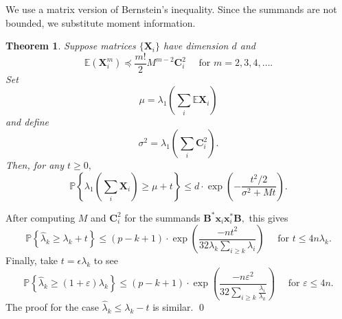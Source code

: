 \documentclass[xcolor={svgnames,pdftex,dvipsnames,table},10pt]{beamer} %
\newcommand{\mat}[1]{\ensuremath{\mathbf{#1}}}
\newcommand{\Prob}[1]{\ensuremath{\mathbb{P}\left\{#1 \right\}}}
\renewcommand{\star}{*}
\newcommand{\E}{\ensuremath{\mathbb{E}}}
\newtheorem*{thm}{Theorem}
\begin{document}
\begin{frame}{}
 We use a matrix version of Bernstein's inequality. Since the summands are not bounded, we substitute moment information.

\begin{thm}
Suppose matrices $\{\mat{X}_i\}$ have dimension $d$ and 
\[\textstyle \E(\mat{X}_i^m) \preceq \frac{m!}{2} M^{m-2} \mat{C}_i^2 \quad \text{ for } m =2,3,4,\ldots.
\]
Set
\[ \textstyle \mu = \lambda_1\left( \sum_i \E\mat{X}_i \right) \]
and define
\[ \textstyle \sigma^2 = \lambda_1\left(\sum_i \mat{C}_i^2 \right). \]
Then, for any $t \geq 0,$
\[	
 \textstyle \Prob{ \lambda_1\left(\sum_i \mat{X}_i\right) \geq \mu + t } \leq d \cdot \exp\left(- \frac{t^2/2}{\sigma^2 + Mt} \right).
\]
\end{thm}

\end{frame}

\begin{frame}{}
 After computing $M$ and $\mat{C}_i^2$ for the summands $\mat{B}^\star \mat{x}_i \mat{x}_i^\star \mat{B},$ this gives
\[
 \Prob{\hat{\lambda}_k \geq \lambda_k +t} \leq (p-k+1)\cdot \exp\left( \frac{-nt^2}{32\lambda_k \sum_{i \geq k} \lambda_i } \right) \quad \text{ for } t \leq 4n \lambda_k.
\]
Finally, take $t = \epsilon \lambda_k$ to see
\[
 \Prob{\hat{\lambda}_k \geq (1+\varepsilon) \lambda_k} \leq (p-k+1)\cdot \exp\left( \frac{-n\varepsilon^2}{32\sum_{i \geq k} \frac{\lambda_i}{\lambda_k} } \right) \quad \text{ for } \varepsilon \leq 4n.
\]
The proof for the case $\hat{\lambda}_k \leq \lambda_k - t$ is similar.
\qed
\end{frame}
\end{document}
